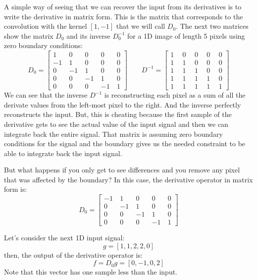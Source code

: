 A simple way of seeing that we can recover the input from its derivatives is to write the derivative in matrix form. This is the matrix that corresponds to the convolution with the kernel $\left[1, -1 \right]$ that we will call $D_0$. The next two matrices show the matrix $D_0$ and its inverse $D_0^{-1}$ for a 1D image of length 5 pixels using zero boundary conditions:
\begin{equation}
D_0 = 
\begin{bmatrix}
  1 ~& 0 ~& 0 ~& 0~& 0 \\
  -1 ~& 1 ~& 0 ~& 0~& 0 \\
  0 ~& -1 ~& 1 ~& 0 ~& 0\\
  0~& 0 ~& -1 ~& 1 ~& 0\\
  0~& 0 ~& 0 ~& -1 ~& 1
 \end{bmatrix}
 ~~~~~~~~~
D^{-1} = 
\begin{bmatrix}
  1 ~&~ 0 ~&~ 0 ~&~ 0~&~ 0 \\
  1 ~&~ 1 ~&~ 0 ~&~ 0~&~ 0 \\
  1 ~&~ 1 ~&~ 1 ~&~ 0 ~&~ 0\\
  1~&~ 1 ~&~ 1 ~&~ 1 ~&~ 0\\
  1~&~ 1 ~&~ 1 ~&~ 1 ~&~ 1
 \end{bmatrix}
\end{equation}
We can see that the inverse $D^{-1}$ is reconstructing each pixel as a sum of all the derivate values from the left-most pixel to the right.  And the inverse perfectly reconstructs the input. But, this is cheating because the first sample of the derivative gets to see the actual value of the input signal and then we can integrate back the entire signal. That matrix is assuming zero boundary conditions for the signal and the boundary gives us the needed constraint to be able to integrate back the input signal. 

But what happens if you only get to see differences and you remove any pixel that was affected by the boundary? In this case, the derivative operator in matrix form is:
\begin{equation}
D_0 = 
\begin{bmatrix}
  -1 ~& 1 ~& 0 ~& 0~& 0 \\
  0 ~& -1 ~& 1 ~& 0 ~& 0\\
  0~& 0 ~& -1 ~& 1 ~& 0\\
  0~& 0 ~& 0 ~& -1 ~& 1
\end{bmatrix}
\end{equation}

Let's consider the next 1D input signal:
\begin{equation}
g = \left[1, 1, 2, 2, 0\right]
\end{equation}
then, the output of the derivative operator is:
\begin{equation}
f=D_0g=\left[0, -1, 0, 2\right]
\end{equation}
Note that this vector has one sample less than the input.

